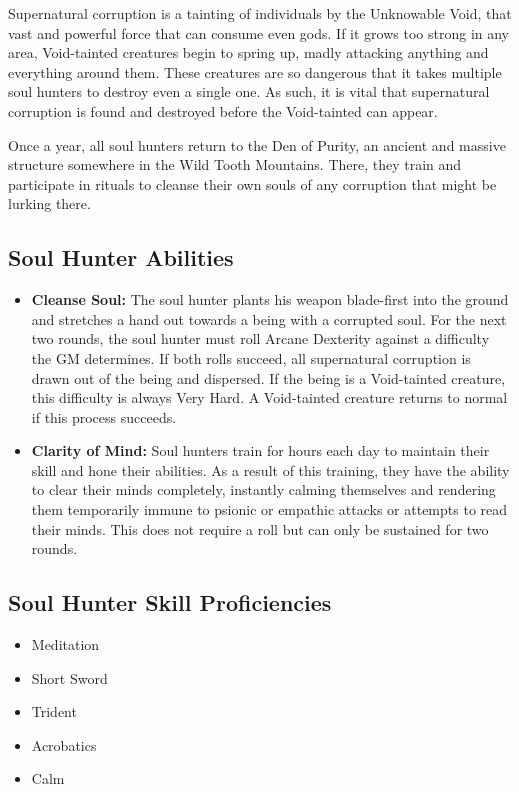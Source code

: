\begin{multicols}{2}
Supernatural corruption is a tainting of individuals by the Unknowable Void, 
that vast and powerful force that can consume even gods. If it grows too strong
in any area, Void-tainted creatures begin to spring up, madly attacking anything
and everything around them. These creatures are so dangerous that it takes
multiple soul hunters to destroy even a single one. As such, it is vital that
supernatural corruption is found and destroyed before the Void-tainted can appear.

Once a year, all soul hunters return to the Den of Purity, an ancient and massive
structure somewhere in the Wild Tooth Mountains. There, they train and
participate in rituals to cleanse their own souls of any corruption that might
be lurking there.

\subsection{Soul Hunter Abilities}

\begin{itemize}
  \item \textbf{Cleanse Soul:} The soul hunter plants his weapon blade-first into
    the ground and stretches a hand out towards a being with a corrupted soul. For
    the next two rounds, the soul hunter must roll Arcane Dexterity against a difficulty
    the GM determines. If both rolls succeed, all supernatural corruption is drawn
    out of the being and dispersed. If the being is a Void-tainted creature, this
    difficulty is always Very Hard. A Void-tainted creature returns to normal if
    this process succeeds.
  \item \textbf{Clarity of Mind:} Soul hunters train for hours each day to maintain
    their skill and hone their abilities. As a result of this training, they have
    the ability to clear their minds completely, instantly calming themselves and rendering
    them temporarily immune to psionic or empathic attacks or attempts to read
    their minds. This does not require a roll but can only be sustained for two rounds.
\end{itemize}

\subsection{Soul Hunter Skill Proficiencies}

\begin{itemize}
  \item Meditation
  \item Short Sword
  \item Trident
  \item Acrobatics
  \item Calm
\end{itemize}


\end{multicols}
